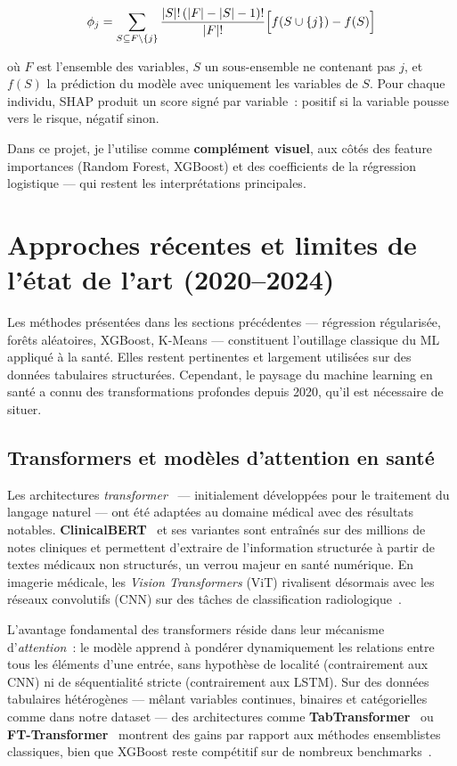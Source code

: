 \begin{equation}
\phi_j = \sum_{S \subseteq F \setminus \{j\}} \frac{|S|!\,(|F|-|S|-1)!}{|F|!} \Bigl[ f(S \cup \{j\}) - f(S) \Bigr]
\end{equation}

où $F$ est l'ensemble des variables, $S$ un sous-ensemble ne contenant pas $j$, et $f(S)$ la prédiction du modèle avec uniquement les variables de $S$. Pour chaque individu, SHAP produit un score signé par variable~: positif si la variable pousse vers le risque, négatif sinon.

Dans ce projet, je l'utilise comme \textbf{complément visuel}, aux côtés des feature importances (Random Forest, XGBoost) et des coefficients de la régression logistique --- qui restent les interprétations principales.

\section{Approches récentes et limites de l'état de l'art (2020--2024)}

Les méthodes présentées dans les sections précédentes --- régression régularisée, forêts aléatoires, XGBoost, K-Means --- constituent l'outillage classique du ML appliqué à la santé. Elles restent pertinentes et largement utilisées sur des données tabulaires structurées. Cependant, le paysage du machine learning en santé a connu des transformations profondes depuis 2020, qu'il est nécessaire de situer.

\subsection{Transformers et modèles d'attention en santé}

Les architectures \textit{transformer}~\cite{vaswani2017} --- initialement développées pour le traitement du langage naturel --- ont été adaptées au domaine médical avec des résultats notables. \textbf{ClinicalBERT}~\cite{alsentzer2019} et ses variantes sont entraînés sur des millions de notes cliniques et permettent d'extraire de l'information structurée à partir de textes médicaux non structurés, un verrou majeur en santé numérique. En imagerie médicale, les \textit{Vision Transformers} (ViT) rivalisent désormais avec les réseaux convolutifs (CNN) sur des tâches de classification radiologique~\cite{rajpurkar2022}.

L'avantage fondamental des transformers réside dans leur mécanisme d'\textit{attention}~: le modèle apprend à pondérer dynamiquement les relations entre tous les éléments d'une entrée, sans hypothèse de localité (contrairement aux CNN) ni de séquentialité stricte (contrairement aux LSTM). Sur des données tabulaires hétérogènes --- mêlant variables continues, binaires et catégorielles comme dans notre dataset --- des architectures comme \textbf{TabTransformer}~\cite{huang2020} ou \textbf{FT-Transformer}~\cite{gorishniy2021} montrent des gains par rapport aux méthodes ensemblistes classiques, bien que XGBoost reste compétitif sur de nombreux benchmarks~\cite{grinsztajn2022}.


